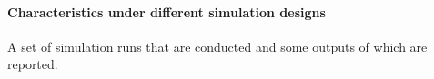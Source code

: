 \documentclass[
]{article}
\begin{document}
\hypertarget{characteristics-under-different-simulation-designs}{%
\paragraph{Characteristics under different simulation designs}\label{characteristics-under-different-simulation-designs}}

A set of simulation runs that are conducted and some outputs of which are reported.
\end{document}
